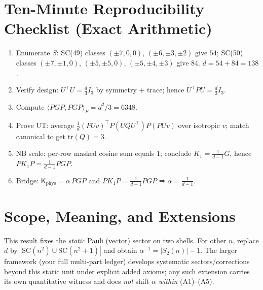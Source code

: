 \documentclass[11pt]{article}
\theoremstyle{definition}
\newcommand{\1}{\mathbf{1}}
\newcommand{\tr}{\mathrm{tr}}
\begin{document}
\section{Ten-Minute Reproducibility Checklist (Exact Arithmetic)}
\begin{enumerate}[label=\arabic*., leftmargin=2.1em]
\item Enumerate $S$: SC(49) classes \((\pm7,0,0)\), \((\pm6,\pm3,\pm2)\) give \(54\); SC(50) classes \((\pm7,\pm1,0)\), \((\pm5,\pm5,0)\), \((\pm5,\pm4,\pm3)\) give \(84\). \(\boxed{d=54+84=138}\).
\item Verify design: \(U^\top U=\tfrac{d}{3}I_3\) by symmetry + trace; hence \(U^\top P U=\tfrac{d}{3}I_3\).
\item Compute \(\langle PGP,PGP\rangle_F=d^2/3=6348\).
\item Prove UT: average \(\frac{1}{d}(PUv)^\top P(UQU^\top)P(PUv)\) over isotropic \(v\); match canonical to get \(\tr(Q)=3\).
\item NB scale: per-row masked cosine sum equals \(1\); conclude \(K_1=\frac{1}{d-1}G\), hence \(PK_1P=\frac{1}{d-1}PGP\).
\item Bridge: \(\mathsf{K}_{\!\mathrm{phys}}=\alpha\,PGP\) and \(PK_1P=\frac{1}{d-1}PGP\) ⇒ \(\alpha=\frac{1}{d-1}\).
\end{enumerate}
\section{Scope, Meaning, and Extensions}
This result fixes the \emph{static} Pauli (vector) sector on two shells. For other \(n\), replace \(d\) by \(|\mathrm{SC}(n^2)\cup\mathrm{SC}(n^2+1)|\) and obtain \(\alpha^{-1}=|S_2(n)|-1\).
The larger framework (your full multi-part ledger) develops systematic sectors/corrections beyond this static unit under explicit added axioms; any such extension carries its own quantitative witness and does \emph{not} shift \(\alpha\) \emph{within} (A1)–(A5).
\end{document}
